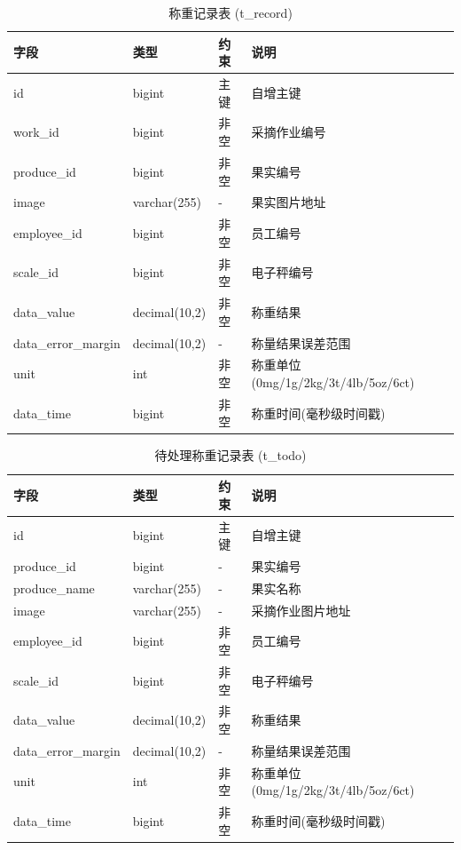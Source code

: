 \begin{table}[H]
\centering
\caption{称重记录表 (t\_record)}
\begin{tabular}{|l|l|l|l|}
\hline
字段 & 类型 & 约束 & 说明 \\
\hline
id & bigint & 主键 & 自增主键 \\
work\_id & bigint & 非空 & 采摘作业编号 \\
produce\_id & bigint & 非空 & 果实编号 \\
image & varchar(255) & - & 果实图片地址 \\
employee\_id & bigint & 非空 & 员工编号 \\
scale\_id & bigint & 非空 & 电子秤编号 \\
data\_value & decimal(10,2) & 非空 & 称重结果 \\
data\_error\_margin & decimal(10,2) & - & 称量结果误差范围 \\
unit & int & 非空 & 称重单位(0mg/1g/2kg/3t/4lb/5oz/6ct) \\
data\_time & bigint & 非空 & 称重时间(毫秒级时间戳) \\
\hline
\end{tabular}
\end{table}

\begin{table}[H]
\centering
\caption{待处理称重记录表 (t\_todo)}
\begin{tabular}{|l|l|l|l|}
\hline
字段 & 类型 & 约束 & 说明 \\
\hline
id & bigint & 主键 & 自增主键 \\
produce\_id & bigint & - & 果实编号 \\
produce\_name & varchar(255) & - & 果实名称 \\
image & varchar(255) & - & 采摘作业图片地址 \\
employee\_id & bigint & 非空 & 员工编号 \\
scale\_id & bigint & 非空 & 电子秤编号 \\
data\_value & decimal(10,2) & 非空 & 称重结果 \\
data\_error\_margin & decimal(10,2) & - & 称量结果误差范围 \\
unit & int & 非空 & 称重单位(0mg/1g/2kg/3t/4lb/5oz/6ct) \\
data\_time & bigint & 非空 & 称重时间(毫秒级时间戳) \\
\hline
\end{tabular}
\end{table}

